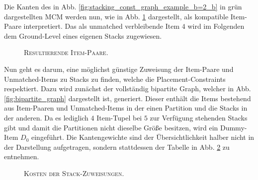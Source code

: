 Die Kanten des in Abb. \ref{fig:stacking_const_graph_example_b=2_b} in grün dargestellten \textsc{MCM} werden nun,
wie in Abb. \ref{fig:item_pairs_b=2} dargestellt, als kompatible Item-Paare interpretiert. Das als unmatched verbleibende
Item $4$ wird im Folgenden dem Ground-Level eines eigenen Stacks zugewiesen.
\begin{figure}[H]
\centering
{}
  \caption{\textsc{Resultierende Item-Paare.}}
  \label{fig:item_pairs_b=2}
\end{figure}

Nun geht es darum, eine möglichst günstige Zuweisung der Item-Paare und Unmatched-Items zu Stacks zu finden,
welche die Placement-Constraints respektiert. Dazu wird zunächst der vollständig bipartite Graph, welcher in
Abb. \ref{fig:bipartite_graph} dargestellt ist, generiert. Dieser enthält die Items bestehend aus Item-Paaren
und Unmatched-Items in der einen Partition und die Stacks in der anderen.
Da es lediglich $4$ Item-Tupel bei $5$ zur Verfügung stehenden Stacks gibt und damit die Partitionen nicht
dieselbe Größe besitzen, wird ein Dummy-Item $D_0$ eingeführt.
Die Kantengewichte sind der Übersichtlichkeit halber nicht in der Darstellung aufgetragen,
sondern stattdessen der Tabelle in Abb. \ref{fig:item_tuple_costs} zu entnehmen.

\pagebreak

\begin{figure}[H]
\centering
{}
\caption{\textsc{Kosten der Stack-Zuweisungen}.}
\label{fig:item_tuple_costs}
\end{figure}

